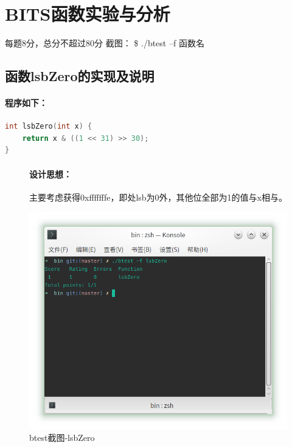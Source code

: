 \section{BITS函数实验与分析}
\begin{center}
    每题8分，总分不超过80分
    截图：  \$ ./btest –f 函数名
\end{center}

\subsection{函数lsbZero的实现及说明}

\paragraph{程序如下：}
\begin{lstlisting}[language = c]
int lsbZero(int x) {
	return x & ((1 << 31) >> 30);
}
\end{lstlisting}

\begin{figure}[H]
\begin{minipage}[c]{0.5\linewidth}
\paragraph{设计思想：}主要考虑获得0xfffffffe，即处lsb为0外，其他位全部为1的值与x相与。
\end{minipage}
\begin{minipage}[c]{0.4\linewidth}
\centering
\includegraphics[width=0.9\linewidth]{figures/lsbZero}
\caption{btest截图-lsbZero}
\label{fig:lsbzero}
\end{minipage}
\end{figure}

